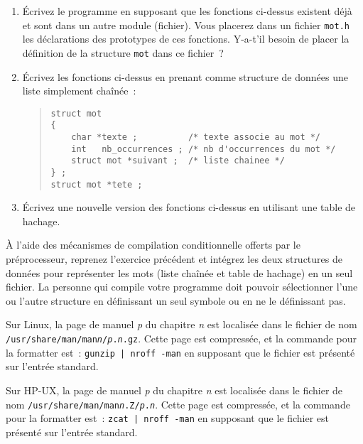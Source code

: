 \begin {enumerate}
    \item Écrivez le programme en supposant que les fonctions
	ci-dessus existent déjà et sont dans un autre module (fichier).
	Vous placerez dans un fichier {\tt mot.h} les déclarations des
	prototypes de ces fonctions.  Y-a-t'il besoin de placer la
	définition de la structure {\tt mot} dans ce fichier~?

    \item Écrivez les fonctions ci-dessus en prenant comme structure
	de données une liste simplement chaînée~:

\begin {quote}
\small
\begin {verbatim}
struct mot
{
    char *texte ;          /* texte associe au mot */
    int   nb_occurrences ; /* nb d'occurrences du mot */
    struct mot *suivant ;  /* liste chainee */
} ;
struct mot *tete ;
\end{verbatim}
\end {quote}

    \item Écrivez une nouvelle version des fonctions ci-dessus en
	utilisant une table de hachage.

\end {enumerate}


\question

\`A l'aide des mécanismes de compilation conditionnelle offerts par le
préprocesseur, reprenez l'exercice précédent et intégrez les deux
structures de données pour représenter les mots (liste chaînée et table
de hachage) en un seul fichier. La personne qui compile votre programme
doit pouvoir sélectionner l'une ou l'autre structure en définissant un
seul symbole ou en ne le définissant pas.


\question

Sur Linux, la page de manuel {\em p} du chapitre {\em n} est localisée
dans le fichier de nom
{\tt /usr/share/man/man{\em n}/{\em p}.{\em n}.gz}. Cette page est
compressée, et la commande pour la formatter est~:
\verb:gunzip | nroff -man: en supposant que le fichier est présenté sur
l'entrée standard.

Sur HP-UX, la page de manuel {\em p} du chapitre {\em n} est localisée
dans le fichier de nom
{\tt /usr/share/man/man{\em n}.Z/{\em p}.{\em n}}. Cette page est
compressée, et la commande pour la formatter est~:
\verb:zcat | nroff -man: en supposant que le fichier est présenté sur
l'entrée standard.

